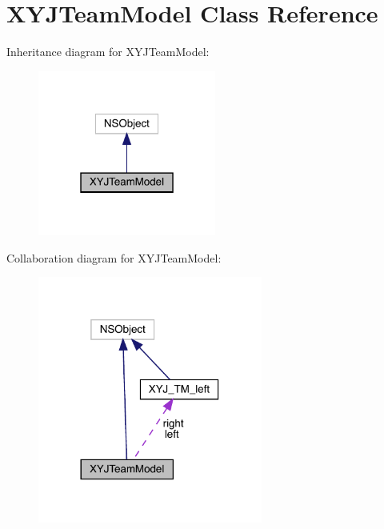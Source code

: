 \hypertarget{interface_x_y_j_team_model}{}\section{X\+Y\+J\+Team\+Model Class Reference}
\label{interface_x_y_j_team_model}


Inheritance diagram for X\+Y\+J\+Team\+Model\+:\nopagebreak
\begin{figure}[H]
\begin{center}
\leavevmode
\includegraphics[width=166pt]{interface_x_y_j_team_model__inherit__graph}
\end{center}
\end{figure}


Collaboration diagram for X\+Y\+J\+Team\+Model\+:\nopagebreak
\begin{figure}[H]
\begin{center}
\leavevmode
\includegraphics[width=209pt]{interface_x_y_j_team_model__coll__graph}
\end{center}
\end{figure}
